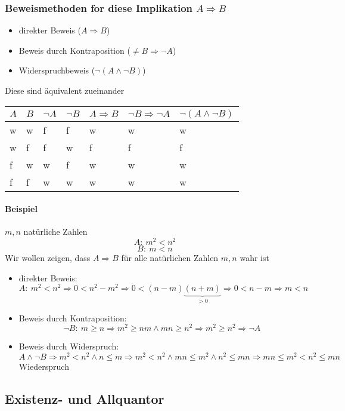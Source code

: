 \documentclass[a4paper]{scrartcl}
\begin{document}
\subsubsection{Beweismethoden for diese Implikation $A\Rightarrow B$}
\label{sec-2-2-2}
\begin{itemize}
\item direkter Beweis ($A\Rightarrow B$)
\item Beweis durch Kontraposition ($\neq B \Rightarrow \neg A$)
\item Widerspruchbeweis ($\neg (A\wedge \neg B)$)
\end{itemize}
Diese sind äquivalent zueinander
\begin{center}
\begin{tabular}{lllllll}
$A$ & $B$ & $\neg A$ & $\neg B$ & $A\Rightarrow B$ & $\neg B \Rightarrow \neg A$ & $\neg (A \wedge \neg B)$\\
\hline
w & w & f & f & w & w & w\\
w & f & f & w & f & f & f\\
f & w & w & f & w & w & w\\
f & f & w & w & w & w & w\\
\end{tabular}
\end{center}
\paragraph{Beispiel}
\label{sec-2-2-2-1}
$m,n$ natürliche Zahlen \\
     \[A:~m^2 < n^2\]
\[B:~m < n\]
Wir wollen zeigen, dass $A\Rightarrow B$ für alle natürlichen Zahlen $m,n$ wahr ist
\begin{itemize}
\item direkter Beweis: \\
       \[A:~m^2 < n^2 \Rightarrow 0 < n^2 - m^2 \Rightarrow 0 < (n-m)\underbrace{(n+m)}_{>0} \Rightarrow 0 < n-m \Rightarrow m<n\]
\item Beweis durch Kontraposition: \\
       \[\neg B:~m \geq n \Rightarrow m^2\geq n m \wedge m n \geq n^2 \Rightarrow m^2 \geq n^2 \Rightarrow \neg A\]
\item Beweis durch Widerspruch: \\
       \[A\wedge \neg B \Rightarrow m^2 < n^2 \wedge n\leq m \Rightarrow m^2 < n^2 \wedge m n \leq m^2 \wedge n^2 \leq m n \Rightarrow m n \leq m^2 < n^2 \leq m n\]
       Wiederspruch
\end{itemize}
\subsection{Existenz- und Allquantor}
\label{sec-2-3}
\end{document}

